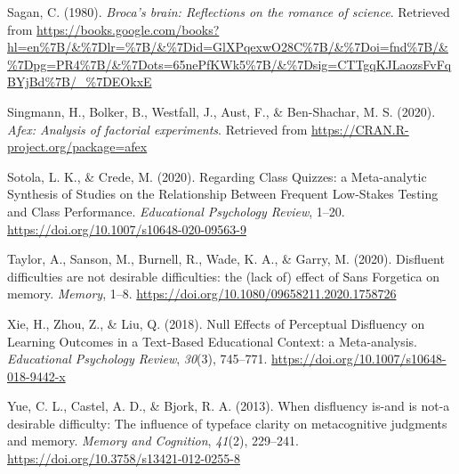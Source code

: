 \documentclass[
  english,
  jou]{apa6}
\begin{document}
\leavevmode\hypertarget{ref-Sagan1980}{}%
Sagan, C. (1980). \emph{Broca's brain: Reflections on the romance of science}. Retrieved from \url{https://books.google.com/books?hl=en\%7B/\&\%7Dlr=\%7B/\&\%7Did=GlXPqexwO28C\%7B/\&\%7Doi=fnd\%7B/\&\%7Dpg=PR4\%7B/\&\%7Dots=65nePfKWk5\%7B/\&\%7Dsig=CTTgqKJLaozsFvFqBYjBd\%7B/_\%7DEOkxE}

\leavevmode\hypertarget{ref-Singmann2020}{}%
Singmann, H., Bolker, B., Westfall, J., Aust, F., \& Ben-Shachar, M. S. (2020). \emph{Afex: Analysis of factorial experiments}. Retrieved from \url{https://CRAN.R-project.org/package=afex}

\leavevmode\hypertarget{ref-Sotola2020}{}%
Sotola, L. K., \& Crede, M. (2020). Regarding Class Quizzes: a Meta-analytic Synthesis of Studies on the Relationship Between Frequent Low-Stakes Testing and Class Performance. \emph{Educational Psychology Review}, 1--20. \url{https://doi.org/10.1007/s10648-020-09563-9}

\leavevmode\hypertarget{ref-Taylor2020}{}%
Taylor, A., Sanson, M., Burnell, R., Wade, K. A., \& Garry, M. (2020). Disfluent difficulties are not desirable difficulties: the (lack of) effect of Sans Forgetica on memory. \emph{Memory}, 1--8. \url{https://doi.org/10.1080/09658211.2020.1758726}

\leavevmode\hypertarget{ref-Xie2018}{}%
Xie, H., Zhou, Z., \& Liu, Q. (2018). Null Effects of Perceptual Disfluency on Learning Outcomes in a Text-Based Educational Context: a Meta-analysis. \emph{Educational Psychology Review}, \emph{30}(3), 745--771. \url{https://doi.org/10.1007/s10648-018-9442-x}

\leavevmode\hypertarget{ref-Yue2013}{}%
Yue, C. L., Castel, A. D., \& Bjork, R. A. (2013). When disfluency is-and is not-a desirable difficulty: The influence of typeface clarity on metacognitive judgments and memory. \emph{Memory and Cognition}, \emph{41}(2), 229--241. \url{https://doi.org/10.3758/s13421-012-0255-8}

\endgroup
\end{document}
